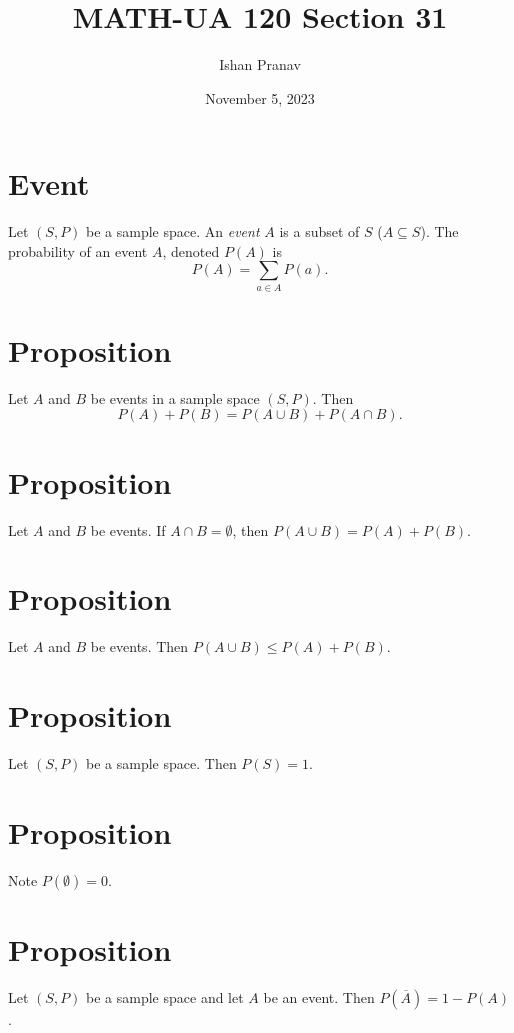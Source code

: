 \documentclass[12pt]{article}
\title{MATH-UA 120 Section 31}
\author{Ishan Pranav}
\date{November 5, 2023}
\begin{document}
\maketitle
\section*{Event}
Let $(S,P)$ be a sample space. An \textit{event} $A$ is a subset of $S$ ($A\subseteq S$). The probability of an event $A$, denoted $P(A)$ is
\[P(A)=\sum_{a\in A}{P(a)}.\]
\section*{Proposition}
Let $A$ and $B$ be events in a sample space $(S,P)$. Then
\[P(A)+P(B)=P(A\cup B)+P(A\cap B).\]
\section*{Proposition}
Let $A$ and $B$ be events. If $A\cap B=\emptyset$, then $P(A\cup B)=P(A)+P(B).$
\section*{Proposition}
Let $A$ and $B$ be events. Then $P(A\cup B)\leq P(A)+P(B)$.
\section*{Proposition}
Let $(S,P)$ be a sample space. Then $P(S)=1.$
\section*{Proposition}
Note $P(\emptyset)=0.$
\section*{Proposition}
Let $(S,P)$ be a sample space and let $A$ be an event. Then $P(\overline{A})=1-P(A)$.
\end{document}
